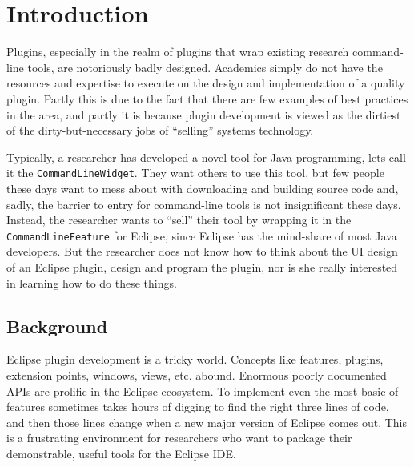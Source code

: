 \documentclass[conference]{IEEEtran}
\begin{document}

%
\IEEEpeerreviewmaketitle


\section{Introduction}
\label{sec:introduction}

Plugins, especially in the realm of plugins that wrap existing
research command-line tools, are notoriously badly designed.
Academics simply do not have the resources and expertise to execute on
the design and implementation of a quality plugin.  Partly this is due
to the fact that there are few examples of best practices in the area,
and partly it is because plugin development is viewed as the dirtiest
of the dirty-but-necessary jobs of ``selling'' systems technology.

Typically, a researcher has developed a novel tool for Java
programming, lets call it the \texttt{CommandLineWidget}.  They want
others to use this tool, but few people these days want to mess about
with downloading and building source code and, sadly, the barrier to
entry for command-line tools is not insignificant these days.
Instead, the researcher wants to ``sell'' their tool by wrapping it in
the \texttt{CommandLineFeature} for Eclipse, since Eclipse has the
mind-share of most Java developers.  But the researcher does not know
how to think about the UI design of an Eclipse plugin, design and
program the plugin, nor is she really interested in learning how to
do these things.

%
\subsection{Background}
\label{sec:background}

Eclipse plugin development is a tricky world.  Concepts like features,
plugins, extension points, windows, views, etc. abound.  Enormous
poorly documented APIs are prolific in the Eclipse ecosystem.  To
implement even the most basic of features sometimes takes hours of
digging to find the right three lines of code, and then those lines
change when a new major version of Eclipse comes out.  This is a
frustrating environment for researchers who want to package their
demonstrable, useful tools for the Eclipse IDE.
\end{document}
